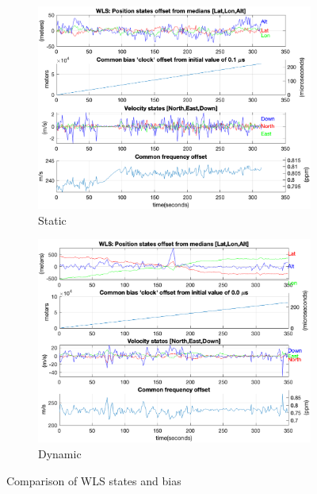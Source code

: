         \begin{figure}[h!]
            \centering
            \begin{subfigure}{0.23\textwidth}
                \includegraphics[width=\textwidth]{images/tests/Monte_Cappuccini/png/Samsung_A51_Monte_Cappuccini_fig5.png}
                \caption{Static}
                \label{fig:WLS_a}
            \end{subfigure}
            \hfill
            \begin{subfigure}{0.23\textwidth}
                \includegraphics[width=\textwidth]{images/tests/Tram_15_trip_Castello_to_Pescatore/filtered/Samsung_A51_Tram_15_trip_Castello_to_Pescatore_fig5.png}
                \caption{Dynamic}
                \label{fig:WLS_b}
            \end{subfigure}
            \vspace{0.35cm}
            \caption{Comparison of WLS states and bias}
            \label{fig:WLS_comparison}
        \end{figure}
    

